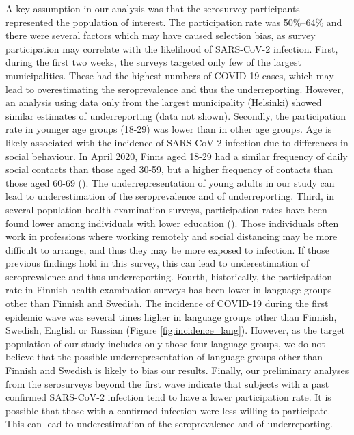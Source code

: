 \documentclass[aoas]{imsart}
\begin{document}
A key assumption in our analysis was that the serosurvey participants represented the population of interest. The participation rate was 50\%–64\% and there were several factors which may have caused selection bias, as survey participation may correlate with the likelihood of SARS-CoV-2 infection. First, during the first two weeks, the surveys targeted only few of the largest municipalities. These had the highest numbers of COVID-19 cases, which may lead to overestimating the seroprevalence and thus the underreporting. However, an analysis using data only from the largest municipality (Helsinki) showed similar estimates of underreporting (data not shown). Secondly, the participation rate in younger age groups (18-29) was lower than in other age groups. Age is likely associated with the incidence of SARS-CoV-2 infection due to differences in social behaviour. In April 2020, Finns aged 18-29 had a similar frequency of daily social contacts than those aged 30-59, but a higher frequency of contacts than those aged 60-69 (\cite{auranen2021}). The underrepresentation of young adults in our study can lead to underestimation of the seroprevalence and of underreporting. Third, in several population health examination surveys, participation rates have been found lower among individuals with lower education (\cite{harkanen2016systematic}). Those individuals often work in professions where working remotely and social distancing may be more difficult to arrange, and thus they may be more exposed to infection. If those previous findings hold in this survey, this can lead to underestimation of seroprevalence and thus underreporting. Fourth, historically, the participation rate in Finnish health examination surveys has been lower in language groups other than Finnish and Swedish\cite{tolonen2018}. The incidence of COVID-19 during the first epidemic wave was several times higher in language groups other than Finnish, Swedish, English or Russian (Figure \ref{fig:incidence_lang}). However, as the target population of our study includes only those four language groups, we do not believe that the possible underrepresentation of language groups other than Finnish and Swedish is likely to bias our results. Finally, our preliminary analyses from the serosurveys beyond the first wave indicate that subjects with a past confirmed SARS-CoV-2 infection tend to have a lower participation rate. It is possible that those with a confirmed infection were less willing to participate. This can lead to underestimation of the seroprevalence and of underreporting.
\end{document}
